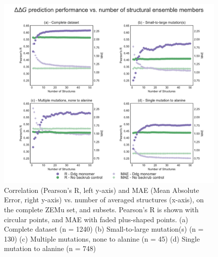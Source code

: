 \begin{figure}
  \includegraphics[width=\textwidth,keepaspectratio]{structs-v-corr-id-ddg-monomer-16-003-zemu-2.pdf}
  \caption[]{ %
    Correlation (Pearson's R, left y-axis) and MAE (Mean Absolute Error, right y-axis) vs. number of averaged structures (x-axis), on the complete ZEMu set, and subsets.
    Pearson's R is shown with circular points, and MAE with faded plus-shaped points.
    (a) Complete dataset (n = 1240)
    (b) Small-to-large mutation(s) (n = 130)
    (c) Multiple mutations, none to alanine (n = 45)
    (d) Single mutation to alanine (n = 748)
  } \label{fig:structs-v-corr-id-ddg-monomer-16-003-zemu-2}
\end{figure}
